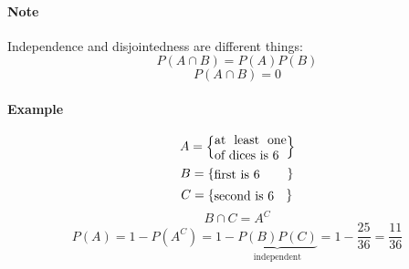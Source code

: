 \paragraph{Note} Independence and disjointedness are different things:
$$P(A\cap B) = P(A)P(B)$$
$$P(A\cap B) = 0$$

\paragraph{Example}
$$A = \left\{ \parbox{2cm}{at least one of dices is 6 } \right\}$$
$$B =  \left\{ \parbox{2cm}{first is 6 } \right\} $$
$$C =  \left\{ \parbox{2cm}{second is 6 } \right\} $$
$$B\cap C =  A^C $$
$$P(A) = 1 - P\left(A^C\right) = 1 -\underbrace{ P(B)P(C)}_{\text{independent}} = 1 - \frac{25}{36} = \frac{11}{36}$$